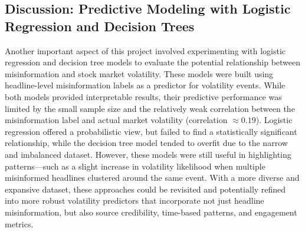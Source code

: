 \documentclass{article}
\begin{document}
\subsection{Discussion: Predictive Modeling with Logistic Regression and Decision Trees}

Another important aspect of this project involved experimenting with logistic regression and decision tree models to evaluate the potential relationship between misinformation and stock market volatility. These models were built using headline-level misinformation labels as a predictor for volatility events. While both models provided interpretable results, their predictive performance was limited by the small sample size and the relatively weak correlation between the misinformation label and actual market volatility (correlation $\approx 0.19$). Logistic regression offered a probabilistic view, but failed to find a statistically significant relationship, while the decision tree model tended to overfit due to the narrow and imbalanced dataset. However, these models were still useful in highlighting patterns---such as a slight increase in volatility likelihood when multiple misinformed headlines clustered around the same event. With a more diverse and expansive dataset, these approaches could be revisited and potentially refined into more robust volatility predictors that incorporate not just headline misinformation, but also source credibility, time-based patterns, and engagement metrics.
\end{document}
